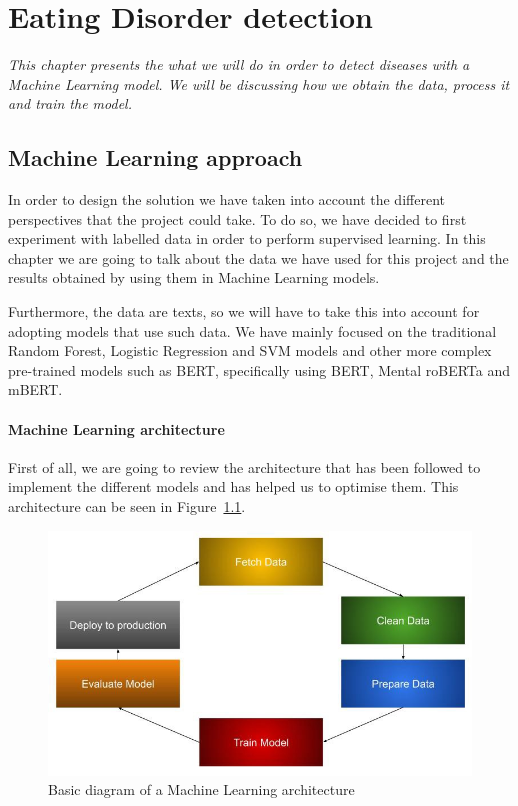 \chapter{Eating Disorder detection}
\label{chap:architecture}
\textit{This chapter presents the what we will do in order to detect diseases with a Machine Learning model. We will be discussing how we obtain the data, process it and train the model.}

\clearpage
\section{Machine Learning approach}
In order to design the solution we have taken into account the different perspectives that the project could take. To do so, we have decided to first experiment with labelled data in order to perform supervised learning. In this chapter we are going to talk about the data we have used for this project and the results obtained by using them in Machine Learning models.

Furthermore, the data are texts, so we will have to take this into account for adopting models that use such data. We have mainly focused on the traditional Random Forest, Logistic Regression and SVM models and other more complex pre-trained models such as BERT, specifically using BERT, Mental roBERTa and mBERT.

\subsubsection{Machine Learning architecture}
First of all, we are going to review the architecture that has been followed to implement the different models and has helped us to optimise them. This architecture can be seen in Figure~\ref{fig:mlarchitecture}.

\begin{figure}[!htp]
    \centering
    \includegraphics[scale=0.55]{img/detection/mlarchitecture.jpeg}
    \caption{Basic diagram of a Machine Learning architecture}
    \label{fig:mlarchitecture}
\end{figure}

